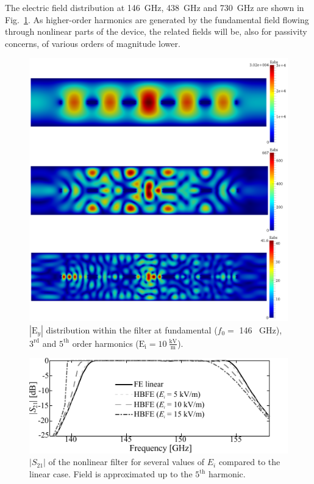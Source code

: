 The electric field distribution at 146~GHz, 438~GHz and 730~GHz are shown in Fig.~\ref{fig:Fields}. As higher-order harmonics are generated by the fundamental field flowing through nonlinear parts of the device, the related fields will be, also for passivity concerns, of various orders of magnitude lower.

\begin{figure}[!ht]
\centering
\includegraphics[width=13.4cm]{FieldsCol}
\caption{$|\mathrm{E}_y|$ distribution within the filter at fundamental 
($f_0 =$ 146 ~GHz), $3^\mathrm{rd}$ and $5^\mathrm{th}$ order harmonics 
($\mathrm{E_i = 10 ~{\frac{\mathrm{kV}}{\mathrm{m}}}}$).}
\label{fig:Fields}
\end{figure}

\begin{figure}[!ht]
\centering
\includegraphics[width=12cm]{spectrumS21b}
\caption{$|S_{21}|$ of the nonlinear filter for
several values of $E_i$ compared to the linear case. Field is approximated
up to the $5^\mathrm{th}$ harmonic.}
\label{fig:spectrum}
\end{figure}

